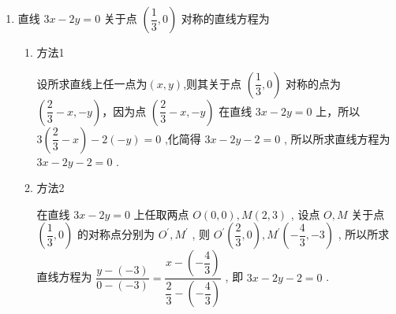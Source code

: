 \begin{enumerate}
\begin{enumerate}
\begin{jieda}
            \ps 两点轴对称问题可以利用垂直和中点两个条件列方程组解题．
        \end{jieda}
        \item 直线 ${3x} - {2y} = 0$ 关于点 $\left( {\dfrac{1}{3},0}\right)$ 对称的直线方程为
        \begin{jieda}
            \begin{enumerate}
                \item 方法1 
                
                设所求直线上任一点为$(x,y)$,则其关于点 $\left( {\dfrac{1}{3},0}\right)$ 对称的点为 $\left( {\dfrac{2}{3} - x, - y}\right)$，因为点 $\left( {\dfrac{2}{3} - x, - y}\right)$ 在直线 ${3x} - {2y} = 0$ 上，所以 $3\left( {\dfrac{2}{3} - x}\right)  - 2\left( {-y}\right)  = 0$ ,化简得 ${3x} - {2y} - 2 = 0$ ,
                所以所求直线方程为 ${3x} - {2y} - 2 = 0$ .

                \item 方法2 
                
                在直线 ${3x} - {2y} = 0$ 上任取两点 $O\left( {0,0}\right) ,M\left( {2,3}\right)$ ,
                设点 $O,M$ 关于点 $\left( {\dfrac{1}{3},0}\right)$ 的对称点分别为 ${O}^{\prime },{M}^{\prime }$ ,
                则 ${O}^{\prime }\left( {\dfrac{2}{3},0}\right) ,{M}^{\prime }\left( {-\dfrac{4}{3}, - 3}\right)$ ,
                所以所求直线方程为 $\dfrac{y - \left( {-3}\right) }{0 - \left( {-3}\right) } = \dfrac{x - \left( {-\dfrac{4}{3}}\right) }{\dfrac{2}{3} - \left( {-\dfrac{4}{3}}\right) }$ ,
                即 ${3x} - {2y} - 2 = 0$ .
            \end{enumerate}
        \end{jieda}
         

\end{enumerate}
\end{enumerate}
